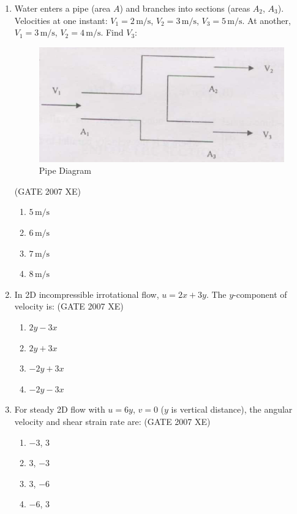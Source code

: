 \documentclass[journal,cmex10]{IEEEtran}
\theoremstyle{remark}
\numberwithin{equation}{enumi}
\numberwithin{figure}{enumi}
\begin{document}
\begin{enumerate}
\item Water enters a pipe (area $A$) and branches into sections (areas $A_2$, $A_3$). Velocities at one instant: $V_1=2\,\text{m/s}$, $V_2=3\,\text{m/s}$, $V_3=5\,\text{m/s}$. At another, $V_1=3\,\text{m/s}$, $V_2=4\,\text{m/s}$. Find $V_3$:  
\begin{figure}[htbp]
  \centering
  \includegraphics[width=0.6\columnwidth]{figs/D/fig1.png}
  \caption{Pipe Diagram}
  \label{fig:D/fig1.png}
\end{figure}
\hfill{(GATE 2007 XE)}
\begin{multicols}{4}
\begin{enumerate}
    \item $5\,\text{m/s}$
    \item $6\,\text{m/s}$
    \item $7\,\text{m/s}$
    \item $8\,\text{m/s}$
\end{enumerate}
\end{multicols}

\newpage
\item In 2D incompressible irrotational flow, $u = 2x + 3y$. The $y$-component of velocity is:  
\hfill{(GATE 2007 XE)}
\begin{enumerate}[label=\alph*)]
    \item $2y - 3x$
    \item $2y + 3x$
    \item $-2y + 3x$
    \item $-2y - 3x$
\end{enumerate}


\item For steady 2D flow with $u=6y$, $v=0$ ($y$ is vertical distance), the angular velocity and shear strain rate are:
\hfill{(GATE 2007 XE)}
\begin{multicols}{4}
\begin{enumerate}
    \item $-3$, $3$
    \item $3$, $-3$
    \item $3$, $-6$
    \item $-6$, $3$
\end{enumerate}
\end{multicols}


\end{enumerate}
\end{document}
